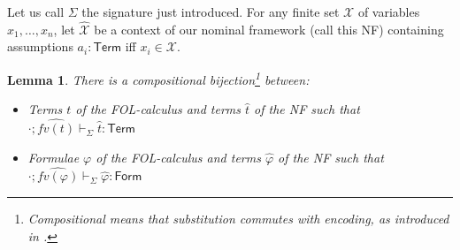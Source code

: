 \documentclass[11pt,a4paper]{amsart}
\newtheorem{lemma}{Lemma}
\newcounter{s}
\newcommand{\typing}[2]{\ensuremath{#1 : #2}}
\newcommand{\emptyCtx}{\cdot}
\newcommand{\tyjdgmntsig}[6]{\ensuremath{#1;#2\vdash_{#4} \typing{#5}{#6}}}
\begin{document}
 Let us call $\Sigma$ the signature just introduced.
For any finite set $\mathcal{X}$ of variables $x_1, \ldots, x_n$, let $\hat{\mathcal{X}}$ be a context of our nominal framework (call this NF) containing assumptions $a_i : \mathsf{Term}$ iff $x_i \in \mathcal{X}$.

\noindent

\begin{lemma}\label{LAdeq:FOL}
There is a compositional bijection\footnote{Compositional means that substitution commutes with encoding, as introduced in \cite{harper:fradl}.} between:
\begin{itemize}
    \item Terms $t$ of the FOL-calculus and terms $\hat{t}$ of the NF such that $\tyjdgmntsig{\emptyCtx}{\widehat{fv(t)}}{\emptyCtx}{\Sigma}{\hat{t}}{\mathsf{Term}}{}$
    \item Formulae $\varphi$ of the FOL-calculus and terms $\hat{\varphi}$ of the NF such that $\tyjdgmntsig{\emptyCtx}{\widehat{fv(\varphi)}}{\emptyCtx}{\Sigma}{\hat{\varphi}}{\mathsf{Form}}{}$
\end{itemize}
\end{lemma}
\end{document}
